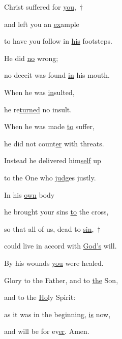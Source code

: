 \noindent Christ suffered for \uline{you},~†~\nopagebreak

and left you an \uline{ex}ample ~\GreStar{}~\nopagebreak

to have you follow in \uline{his} footsteps.

\noindent He did \uline{no} wrong; ~\GreStar{}~\nopagebreak

no deceit was found \uline{in} his mouth.

\noindent When he was \uline{in}sulted, ~\GreStar{}~\nopagebreak

he re\uline{turned} no insult.

\noindent When he was made \uline{to} suffer, ~\GreStar{}~\nopagebreak

he did not count\uline{er} with threats.

\noindent Instead he delivered him\uline{self} up ~\GreStar{}~\nopagebreak

to the One who \uline{judg}es justly.

\noindent In his \uline{own} body ~\GreStar{}~\nopagebreak

he brought your sins \uline{to} the cross,

\noindent so that all of us, dead to \uline{sin},~†~\nopagebreak

could live in accord with \uline{God’s} will. ~\GreStar{}~\nopagebreak

By his wounds \uline{you} were healed.

\noindent Glory to the Father, and to \uline{the} Son,~\GreStar{}~\nopagebreak

and to the \uline{Ho}ly Spirit:

\noindent as it was in the beginning, \uline{is} now,~\GreStar{}~\nopagebreak

and will be for ev\uline{er}. Amen.
